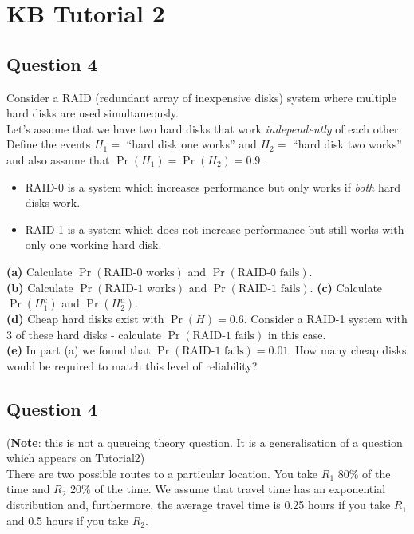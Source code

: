 \section{KB Tutorial 2}

\subsection*{Question 4}
Consider a RAID (redundant array of inexpensive disks) system where multiple hard disks are used simultaneously.\\[0.2cm]
Let's assume that we have two hard disks that work \emph{independently} of each other. Define the events $H_1 =$ ``hard disk one works'' and $H_2 =$ ``hard disk two works'' and also assume that $\Pr(H_1) = \Pr(H_2) = 0.9$.\\ \smallskip
\begin{itemize}
\item RAID-0 is a system which increases performance but only works if \emph{both} hard disks work.
\item RAID-1 is a system which does not increase performance but still works with only one working hard disk.
\end{itemize}

{\bf(a)} Calculate $\Pr(\text{RAID-0 works})$ and $\Pr(\text{RAID-0 fails})$. \\[0.3cm] 
{\bf(b)} Calculate $\Pr(\text{RAID-1 works})$ and $\Pr(\text{RAID-1 fails})$. 
{\bf(c)} Calculate $\Pr(H_1^c)$ and $\Pr(H_2^c)$. \\[0.3cm]

{\bf(d)} Cheap hard disks exist with $\Pr(H) = 0.6$. Consider a RAID-1 system with 3 of these hard disks - calculate $\Pr(\text{RAID-1 fails})$ in this case. \\[0.3cm] 
{\bf(e)} In part (a) we found that $\Pr(\text{RAID-1 fails}) = 0.01$. How many cheap disks would be required to match this level of reliability?




\subsection*{Question 4}
{\footnotesize({\bf Note}: this is not a queueing theory question. It is a generalisation of a question which appears on Tutorial2)}\\[0.1cm]
There are two possible routes to a particular location. You take $R_1$ 80\% of the time and $R_2$ 20\% of the time. We assume that travel time has an exponential distribution and, furthermore, the average travel time is 0.25 hours if you take $R_1$ and 0.5 hours if you take $R_2$.\\[-0.2cm]

